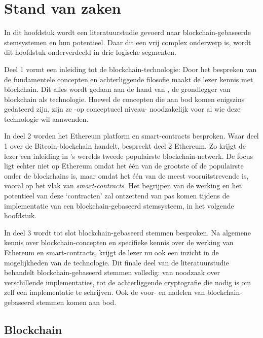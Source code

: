 \chapter{Stand van zaken}
\label{ch:stand-van-zaken}
In dit hoofdstuk wordt een literatuurstudie gevoerd naar blockchain-gebaseerde stemsystemen en hun potentieel. Daar dit een vrij complex onderwerp is, wordt dit hoofdstuk onderverdeeld in drie logische segmenten.

 Deel 1 vormt een inleiding tot de blockchain-technologie: Door het bespreken van de fundamentele concepten en achterliggende filosofie  maakt de  lezer kennis  met  blockchain. Dit alles wordt gedaan aan de hand van \textcite{Nakamoto2008}, de grondlegger van blockchain als technologie.  Hoewel de concepten die aan bod komen enigszins gedateerd zijn, zijn ze -op conceptueel niveau- noodzakelijk voor al wie deze technologie wil aanwenden.

In deel 2 worden het Ethereum platform en smart-contracts besproken. Waar deel 1 over de Bitcoin-blockchain handelt, bespreekt deel 2  Ethereum. Zo krijgt de lezer een inleiding in 's werelds tweede populairste blockchain-netwerk. De focus ligt echter niet op Ethereum omdat het één van de grootste of de populairste onder de blockchains is, maar omdat het één van de meest vooruitstrevende is, vooral op het vlak van \textit{smart-contracts}. Het begrijpen van de werking en het potentieel van deze `contracten' zal ontzettend van pas komen tijdens de implementatie van een blockchain-gebaseerd stemsysteem, in het volgende hoofdstuk.

In deel 3 wordt tot slot blockchain-gebaseerd stemmen besproken. Na algemene kennis over blockchain-concepten en specifieke kennis over de werking van Ethereum en smart-contracts, krijgt de lezer nu ook een inzicht in de mogelijkheden van de technologie. Dit finale deel van de literatuurstudie behandelt blockchain-gebaseerd stemmen volledig: van noodzaak over verschillende implementaties, tot de achterliggende cryptografie die nodig is om zelf een implementatie te schrijven. Ook de voor- en nadelen van blockchain-gebaseerd stemmen komen aan bod.

\newpage
\section{Blockchain}
